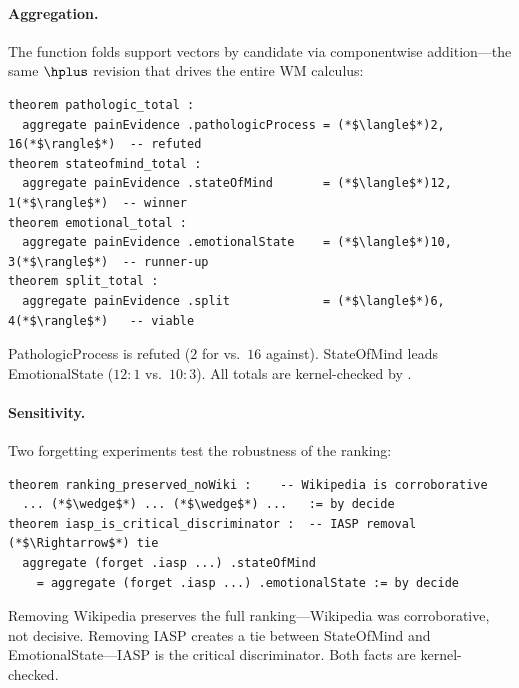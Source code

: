 \documentclass[11pt,openany]{report}
\begin{document}
\paragraph{Aggregation.}
The  function folds support vectors by candidate
via componentwise addition---the same $\hplus$ revision that
drives the entire WM calculus:

\begin{lstlisting}[language={}]
theorem pathologic_total :
  aggregate painEvidence .pathologicProcess = (*$\langle$*)2, 16(*$\rangle$*)  -- refuted
theorem stateofmind_total :
  aggregate painEvidence .stateOfMind       = (*$\langle$*)12, 1(*$\rangle$*)  -- winner
theorem emotional_total :
  aggregate painEvidence .emotionalState    = (*$\langle$*)10, 3(*$\rangle$*)  -- runner-up
theorem split_total :
  aggregate painEvidence .split             = (*$\langle$*)6, 4(*$\rangle$*)   -- viable
\end{lstlisting}

\noindent
PathologicProcess is refuted ($2$ for vs.\ $16$ against).
StateOfMind leads EmotionalState ($12{:}1$ vs.\ $10{:}3$).
All totals are kernel-checked by .

\paragraph{Sensitivity.}
Two forgetting experiments test the robustness of the ranking:

\begin{lstlisting}[language={}]
theorem ranking_preserved_noWiki :    -- Wikipedia is corroborative
  ... (*$\wedge$*) ... (*$\wedge$*) ...   := by decide
theorem iasp_is_critical_discriminator :  -- IASP removal (*$\Rightarrow$*) tie
  aggregate (forget .iasp ...) .stateOfMind
    = aggregate (forget .iasp ...) .emotionalState := by decide
\end{lstlisting}

\noindent
Removing Wikipedia preserves the full ranking---Wikipedia was
corroborative, not decisive.  Removing IASP creates a tie between
StateOfMind and EmotionalState---IASP is the critical
discriminator.  Both facts are kernel-checked.
\end{document}
